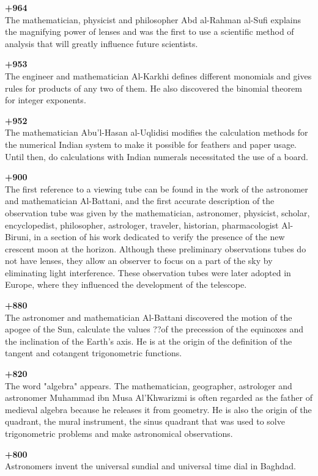 \textbf{+964}\\
The mathematician, physicist and philosopher Abd al-Rahman al-Sufi explains the magnifying power of lenses and was the first to use a scientific method of analysis that will greatly influence future scientists.

\textbf{+953}\\
The engineer and mathematician Al-Karkhi defines different monomials and gives rules for products of any two of them. He also discovered the binomial theorem for integer exponents.

\textbf{+952}\\
The mathematician Abu'l-Hasan al-Uqlidisi modifies the calculation methods for the numerical Indian system to make it possible for feathers and paper usage. Until then, do calculations with Indian numerals necessitated the use of a board.

\textbf{+900}\\
The first reference to a viewing tube can be found in the work of the astronomer and mathematician Al-Battani, and the first accurate description of the observation tube was given by the mathematician, astronomer, physicist, scholar, encyclopedist, philosopher, astrologer, traveler, historian, pharmacologist Al-Biruni, in a section of his work dedicated to verify the presence of the new crescent moon at the horizon. Although these preliminary observations tubes do not have lenses, they allow an observer to focus on a part of the sky by eliminating light interference. These observation tubes were later adopted in Europe, where they influenced the development of the telescope.

\textbf{+880}\\
The astronomer and mathematician Al-Battani discovered the motion of the apogee of the Sun, calculate the values ??of the precession of the equinoxes and the inclination of the Earth's axis. He is at the origin of the definition of the tangent and cotangent trigonometric functions.

\textbf{+820}\\
The word "algebra" appears. The mathematician, geographer, astrologer and astronomer Muhammad ibn Musa Al'Khwarizmi is often regarded as the father of medieval algebra because he releases it from geometry. He is also the origin of the quadrant, the mural instrument, the sinus quadrant that was used to solve trigonometric problems and make astronomical observations.

\textbf{+800}\\
Astronomers invent the universal sundial and universal time dial in Baghdad.


